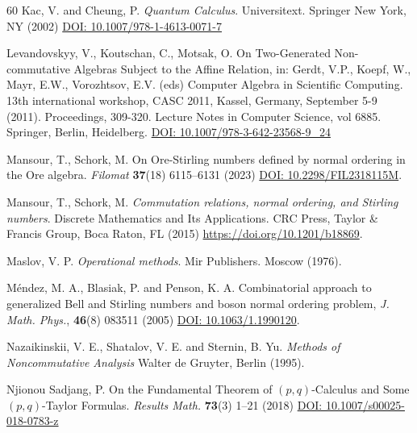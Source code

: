 \documentclass{amsart}
\theoremstyle{definition}
\theoremstyle{remark}
\numberwithin{equation}{section}
\begin{document}
\begin{thebibliography}{60}
 Kac, V. and Cheung, P. {\em Quantum Calculus}. Universitext. Springer New York, NY (2002) \href{https://doi.org/10.1007/978-1-4613-0071-7}{DOI: 10.1007/978-1-4613-0071-7}

 Levandovskyy, V., Koutschan, C., Motsak, O. On Two-Generated Non-commutative Algebras Subject to the Affine Relation, in: Gerdt, V.P., Koepf, W., Mayr, E.W., Vorozhtsov, E.V. (eds) Computer Algebra in Scientific Computing. 13th international workshop, CASC 2011, Kassel, Germany, September 5-9 (2011). Proceedings, 309-320. Lecture Notes in Computer Science, vol 6885. Springer, Berlin, Heidelberg. \href{https://doi.org/10.1007/978-3-642-23568-9\_24}{DOI: 10.1007/978-3-642-23568-9\_24}

 Mansour, T., Schork, M. On Ore-Stirling numbers defined by normal ordering in the Ore algebra. {\em Filomat} {\bf 37}(18) 6115--6131 (2023) \href{https://doi.org/10.2298/FIL2318115M}{DOI: 10.2298/FIL2318115M}.

 Mansour, T., Schork, M. {\em Commutation relations, normal ordering, and Stirling numbers}. Discrete Mathematics and Its Applications. CRC Press, Taylor \& Francis Group, Boca Raton, FL (2015) \href{https://doi.org/10.1201/b18869}{https://doi.org/10.1201/b18869}.

 Maslov, V. P. {\em Operational methods}. Mir Publishers. Moscow (1976).

 M\'endez, M. A., Blasiak, P. and Penson, K. A. Combinatorial approach to generalized Bell and Stirling numbers and boson normal ordering problem, {\em J. Math. Phys.}, {\bf 46}(8) 083511 (2005) \href{https://doi.org/10.1063/1.1990120}{DOI: 10.1063/1.1990120}.

 Nazaikinskii, V. E., Shatalov, V. E. and Sternin, B. Yu. {\em Methods of Noncommutative Analysis} Walter de Gruyter, Berlin (1995).

 Njionou Sadjang, P. On the Fundamental Theorem of $(p, q)$-{C}alculus and Some $(p, q)$-Taylor {F}ormulas. {\em Results Math.} {\bf 73}(3) 1--21 (2018) \href{https://doi.org/10.1007/s00025-018-0783-z}{DOI: 10.1007/s00025-018-0783-z}



\end{thebibliography}
\end{document}
